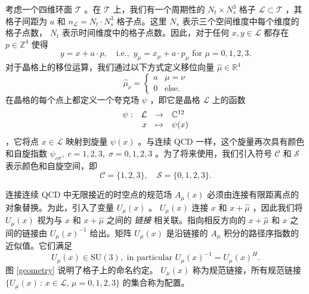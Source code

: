 \documentclass{siamltex}
\begin{document}
考虑一个四维环面    $\mathcal{T}$    。在    $\mathcal{T}$    上，我们有一个周期性的    $N_t \times N_s^3$    格子    $\mathcal{L} \subset \mathcal{T}$    ，其格子间距为    $a$    和    $n_{\mathcal{L}} = N_t \cdot N_s^3$    格子点。这里    $N_s$    表示三个空间维度中每个维度的格子点数，   $N_t$    表示时间维度中的格子点数。因此，对于任何    $x,y \in \mathcal{L}$    都存在    $p \in \mathbb{Z}^4$    使得
$$
  y = x + a \cdot p, \quad \mbox{i.e., } \,  y_\mu = x_\mu + a \cdot p_\mu  \text{ for }  \mu=0,1,2,3.
$$    对于晶格上的移位运算，我们通过以下方式定义移位向量    $ \hat{\mu} \in \mathbb{R}^4 $
$$
  \hat{\mu}_{\nu} = \begin{cases} a & \mu=\nu  \\  0 & \text{else.} \end{cases}
$$    在晶格的每个点上都定义一个夸克场    $\psi$   ，即它是晶格    $\mathcal{L}$    上的函数
$$
  \begin{array}[h]{rrcl}
    \psi: & \mathcal{L} & \rightarrow & \mathbb{C}^{12} \\
          & x           & \mapsto     & \psi(x)
  \end{array}
$$    ，它将点    $x \in \mathcal{L}$    映射到旋量    $\psi(x)$    。与连续 QCD 一样，这个旋量再次具有颜色和自旋指数    $\psi_{c \sigma}, \; c=1,2,3, \; \sigma=0,1,2,3$    。为了将来使用，我们引入符号    $\mathcal{C}$    和    $\mathcal{S}$    表示颜色和自旋空间，即
\[
  \mathcal{C} =  \{ 1,2,3 \} , \quad \mathcal{S} =  \{ 0,1,2,3 \} .
\]

连接连续 QCD 中无限接近的时空点的规范场    $A_{\mu}(x)$    必须由连接有限距离点的对象替换。为此，引入了变量    $U_\mu(x)$   。   $U_\mu(x)$    连接    $x$    和    $x+\hat{\mu}$    ，因此我们将    $U_\mu(x)$    视为与    $x$    和    $x+\hat{\mu}$    之间的  {    \em    链接   }  相关联。指向相反方向的    $x+\hat{\mu}$    和    $x$    之间的链接由    $U_\mu(x)^{-1}$    给出。矩阵    $U_\mu(x)$    是沿链接的    $A_\mu$    积分的路径序指数的近似值。它们满足
\begin{equation*}
  U_\mu(x) \in \mathrm{SU}(3), \text{ in particular } U_\mu(x)^{-1} = U_\mu(x)^H.
\end{equation*}    图    \ref{geometry}    说明了格子上的命名约定。    $U_\mu(x)$    称为规范链接，所有规范链接    $ \{  U_\mu(x) \, : \, x\in \mathcal{L}, \, \mu=0,1,2,3  \} $    的集合称为配置。
\end{document}
